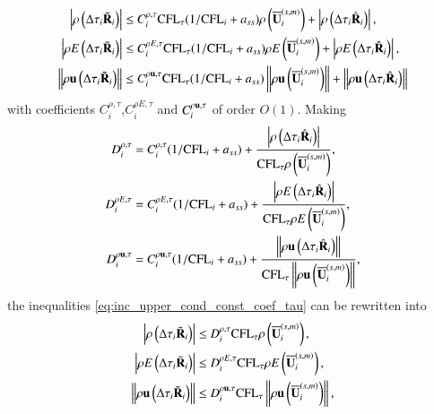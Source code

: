 \begin{equation}
    \begin{aligned}
    \label{eq:inc_upper_cond_const_coef_tau}
        \left| \rho\left( \mathrm\Delta\tau_i \tilde{\mathbf{R}}_i \right) \right|
        & \leq
        C^{\rho,\tau}_i \text{CFL}_\tau(1 / \text{CFL}_i + a_{ss})
        \rho\left( \overline{\mathbf{U}}_i^{\left(s,m\right)} \right)
        + \left| \rho\left(\mathrm\Delta\tau_i\hat{\mathbf{R}}_i\right) \right|,\\
        \left| \rho E\left(\mathrm\Delta\tau_i \tilde{\mathbf{R}}_i \right) \right|
        & \leq
        C^{\rho E,\tau}_i \text{CFL}_\tau(1 / \text{CFL}_i + a_{ss})
        \rho E\left( \overline{\mathbf{U}}_i^{\left(s,m\right)} \right)
        + \left | \rho E\left(\mathrm\Delta\tau_i\hat{\mathbf{R}}_i\right) \right|,\\
        \left\| \rho \mathbf{u}\left( \mathrm\Delta\tau_i \tilde{\mathbf{R}}_i \right) \right\|
        & \leq
        C^{\rho \mathbf{u},\tau}_i \text{CFL}_\tau(1 / \text{CFL}_i + a_{ss})
        \left\| \rho \mathbf{u}\left( \overline{\mathbf{U}}_i^{\left(s,m\right)} \right)              \right\| + \left\|\rho\mathbf{u}\left(\mathrm\Delta\tau_i\hat{\mathbf{R}}_i\right) \right\|\\
    \end{aligned}
\end{equation}
with coefficients $C^{\rho ,\tau}_i$,$C^{\rho E,\tau}_i$ and $C^{\rho \mathbf{u},\tau}_i$
of order $O(1)$.
Making
\begin{equation}
    \begin{aligned}
    \label{eq:inc_upper_cond_const_coef_tau_recast_method}
        D^{\rho,\tau}_i
        & =
        C^{\rho,\tau}_i (1 / \text{CFL}_i + a_{ss})
        + \frac{\left| \rho\left(\mathrm\Delta\tau_i \hat{\mathbf{R}}_i\right) \right|}
        { \text{CFL}_\tau\rho\left( \overline{\mathbf{U}}_i^{\left(s,m\right)} \right)},
        \\
        D^{\rho E,\tau}_i
        & =
        C^{\rho E,\tau}_i (1 / \text{CFL}_i + a_{ss})
        + \frac{\left| \rho E\left(\mathrm\Delta\tau_i \hat{\mathbf{R}}_i\right) \right|}
        { \text{CFL}_\tau\rho E\left( \overline{\mathbf{U}}_i^{\left(s,m\right)} \right)},
        \\
        D^{\rho \mathbf{u},\tau}_i
        & =
        C^{\rho \mathbf{u},\tau}_i (1 / \text{CFL}_i + a_{ss})
        + \frac{\left\|\rho\mathbf{u}\left(\mathrm\Delta\tau_i \hat{\mathbf{R}}_i\right) \right\|}
        { \text{CFL}_\tau\left\|\rho \mathbf{u}\left( \overline{\mathbf{U}}_i^{\left(s,m\right)} \right)\right\|}
        ,\\
    \end{aligned}
\end{equation}
the inequalities \eqref{eq:inc_upper_cond_const_coef_tau} can be 
rewritten into 
\begin{equation}
    \begin{aligned}
    \label{eq:inc_upper_cond_const_coef_tau_recasted}
        \left| \rho\left( \mathrm\Delta\tau_i \tilde{\mathbf{R}}_i \right) \right|
        & \leq
        D^{\rho,\tau}_i \text{CFL}_\tau
        \rho\left( \overline{\mathbf{U}}_i^{\left(s,m\right)} \right)
        ,\\
        \left| \rho E\left(\mathrm\Delta\tau_i \tilde{\mathbf{R}}_i \right) \right|
        & \leq
        D^{\rho E,\tau}_i \text{CFL}_\tau
        \rho E\left( \overline{\mathbf{U}}_i^{\left(s,m\right)} \right)
        ,\\
        \left\| \rho \mathbf{u}\left( \mathrm\Delta\tau_i \tilde{\mathbf{R}}_i \right) \right\|
        & \leq
        D^{\rho \mathbf{u},\tau}_i \text{CFL}_\tau
        \left\| \rho \mathbf{u}\left( \overline{\mathbf{U}}_i^{\left(s,m\right)} \right)              \right\| 
        ,\\
    \end{aligned}
\end{equation}
